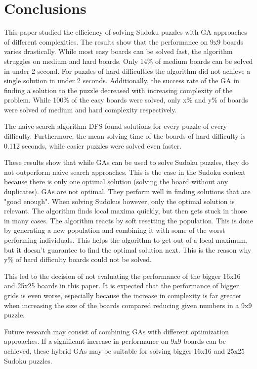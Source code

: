 \section{Conclusions}
\label{sec:conclusions}

This paper studied the efficiency of solving Sudoku puzzles with GA approaches of different complexities. The results show that the performance on 9x9 boards varies drastically. While most easy boards can be solved fast, the algorithm struggles on medium and hard boards. Only 14\% of medium boards can be solved in under 2 second. For puzzles of hard difficulties the algorithm did not achieve a single solution in under 2 seconds. Additionally, the success rate of the GA in finding a solution to the puzzle decreased with increasing complexity of the problem. While 100\% of the easy boards were solved, only x\% and y\% of boards were solved of medium and hard complexity respectively. 

The naive search algorithm DFS found solutions for every puzzle of every difficulty. Furthermore, the mean solving time of the boards of hard difficulty is 0.112 seconds, while easier puzzles were solved even faster. 

These results show that while GAs can be used to solve Sudoku puzzles, they do not outperform naive search approaches. This is the case in the Sudoku context because there is only one optimal solution (solving the board without any duplicates). GAs are not optimal. They perform well in finding solutions that are "good enough". When solving Sudokus however, only the optimal solution is relevant. The algorithm finds local maxima quickly, but then gets stuck in those in many cases. The algorithm reacts by soft resetting the population. This is done by generating a new population and combining it with some of the worst performing individuals. This helps the algorithm to get out of a local maximum, but it doesn't guarantee to find the optimal solution next. This is the reason why y\% of hard difficulty boards could not be solved.

This led to the decision of not evaluating the performance of the bigger 16x16 and 25x25 boards in this paper. It is expected that the performance of bigger grids is even worse, especially because the increase in complexity is far greater when increasing the size of the boards compared reducing given numbers in a 9x9 puzzle.

Future research may consist of combining GAs with different optimization approaches. If a significant increase in performance on 9x9 boards can be achieved, these hybrid GAs may be suitable for solving bigger 16x16 and 25x25 Sudoku puzzles.